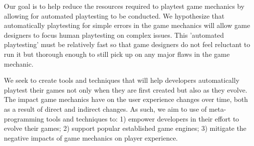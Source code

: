 

Our goal is to help reduce the resources required to playtest game mechanics by allowing for automated playtesting to be conducted. We hypothesize that automatically playtesting for simple errors in the game mechanics will allow game designers to focus human playtesting on complex issues. This 'automated playtesting' must be relatively fast so that game designers do not feel reluctant to run it but thorough enough to still pick up on any major flaws in the game mechanic.

We seek to create tools and techniques that will help developers automatically playtest their games not only when they are first created but also as they evolve. The impact game mechanics have on the user experience changes over time, both as a result of direct and indirect changes. As such, we aim to use of meta-programming tools and techniques to: 1) empower developers in their effort to evolve their games; 2) support popular established game engines; 3) mitigate the negative impacts of game mechanics on player experience.


